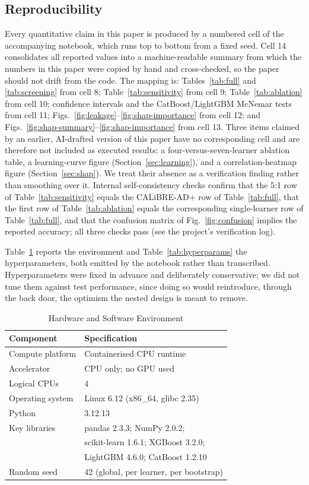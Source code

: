 \documentclass[conference]{IEEEtran}
\begin{document}
\subsection{Reproducibility}
\label{sec:reproducibility}
Every quantitative claim in this paper is produced by a numbered cell of the accompanying notebook, which runs top to bottom from a fixed seed. Cell 14 consolidates all reported values into a machine-readable summary from which the numbers in this paper were copied by hand and cross-checked, so the paper should not drift from the code. The mapping is: Tables~\ref{tab:full} and \ref{tab:screening} from cell 8; Table~\ref{tab:sensitivity} from cell 9; Table~\ref{tab:ablation} from cell 10; confidence intervals and the CatBoost/LightGBM McNemar tests from cell 11; Figs.~\ref{fig:leakage}--\ref{fig:shap-importance} from cell 12; and Figs.~\ref{fig:shap-summary}--\ref{fig:shap-importance} from cell 13. Three items claimed by an earlier, AI-drafted version of this paper have no corresponding cell and are therefore not included as executed results: a four-versus-seven-learner ablation table, a learning-curve figure (Section~\ref{sec:learning}), and a correlation-heatmap figure (Section~\ref{sec:shap}). We treat their absence as a verification finding rather than smoothing over it. Internal self-consistency checks confirm that the 5:1 row of Table~\ref{tab:sensitivity} equals the CALiBRE-AD+ row of Table~\ref{tab:full}, that the first row of Table~\ref{tab:ablation} equals the corresponding single-learner row of Table~\ref{tab:full}, and that the confusion matrix of Fig.~\ref{fig:confusion} implies the reported accuracy; all three checks pass (see the project's verification log).

Table~\ref{tab:env} reports the environment and Table~\ref{tab:hyperparams} the hyperparameters, both emitted by the notebook rather than transcribed. Hyperparameters were fixed in advance and deliberately conservative; we did not tune them against test performance, since doing so would reintroduce, through the back door, the optimism the nested design is meant to remove.

\begin{table}[!t]
\caption{Hardware and Software Environment}
\label{tab:env}
\centering
\begin{tabular}{@{}ll@{}}
\toprule
\textbf{Component} & \textbf{Specification} \\
\midrule
Compute platform & Containerised CPU runtime \\
Accelerator & CPU only; no GPU used \\
Logical CPUs & 4 \\
Operating system & Linux 6.12 (x86\_64, glibc 2.35) \\
Python & 3.12.13 \\
Key libraries & pandas 2.3.3; NumPy 2.0.2; \\
 & scikit-learn 1.6.1; XGBoost 3.2.0; \\
 & LightGBM 4.6.0; CatBoost 1.2.10 \\
Random seed & 42 (global, per learner, per bootstrap) \\
\bottomrule
\end{tabular}
\end{table}
\end{document}
